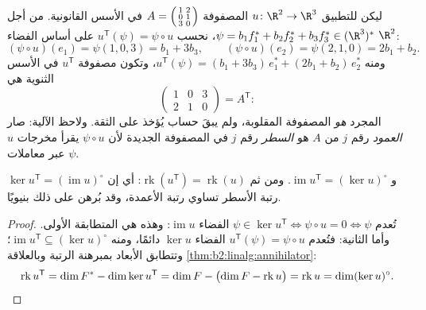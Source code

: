 \begin{example}\label{ex:b2:linalg:transposework}
ليكن للتطبيق $u \colon \R^2 \to \R^3$ المصفوفة $A =
\begin{psmallmatrix} 1 & 2\\ 0 & 1\\ 3 & 0\end{psmallmatrix}$ في
الأسس القانونية. من أجل $\psi = b_1f_1^* + b_2f_2^* + b_3f_3^*
\in (\R^3)^*$، نحسب $u^{\mathsf T}(\psi) = \psi \circ u$ على
أساس الفضاء $\R^2$:
\[
(\psi \circ u)(e_1) = \psi(1, 0, 3) = b_1 + 3b_3,
\qquad
(\psi \circ u)(e_2) = \psi(2, 1, 0) = 2b_1 + b_2 .
\]
ومنه $u^{\mathsf T}(\psi) = (b_1 + 3b_3)\,e_1^* + (2b_1 +
b_2)\,e_2^*$، وتكون مصفوفة $u^{\mathsf T}$ في الأسس الثنوية هي
\[
\begin{pmatrix} 1 & 0 & 3\\ 2 & 1 & 0\end{pmatrix}
= A^{\mathsf T} :
\]
 المجرد \emph{هو} المصفوفة المقلوبة، ولم يبقَ حساب
يُؤخذ على الثقة. ولاحظ الآلية: صار \emph{العمود} رقم
$j$ من $A$ هو \emph{السطر} رقم $j$ في المصفوفة
الجديدة لأن $\psi \circ u$ يقرأ مخرجات $u$ عبر
معاملات $\psi$.
\end{example}

\begin{proposition}\label{prop:b2:linalg:transposerank}
$\ker u^{\mathsf T} = (\operatorname{im} u)^{\circ}$ و
$\operatorname{im} u^{\mathsf T} = (\ker u)^{\circ}$. ومن ثم
$\operatorname{rk}(u^{\mathsf T}) = \operatorname{rk}(u)$: أي إن رتبة الأسطر
تساوي رتبة الأعمدة، وقد بُرهن على ذلك بنيويًا.
\end{proposition}

\begin{proof}
تُعدم $\psi \in \ker u^{\mathsf T} \iff \psi \circ u = 0 \iff \psi$ الفضاء
$\operatorname{im} u$: وهذه هي المتطابقة الأولى. وأما الثانية: فتُعدم $u^{\mathsf
T}(\psi) = \psi \circ u$ الفضاء $\ker u$ دائمًا، ومنه
$\operatorname{im} u^{\mathsf T} \subseteq (\ker u)^\circ$؛
وتتطابق الأبعاد بمبرهنة الرتبة وبالعلاقة
\cref{thm:b2:linalg:annihilator}:
\[
\operatorname{rk} u^{\mathsf T} = \dim F^* - \dim\ker u^{\mathsf T}
= \dim F - \bigl(\dim F - \operatorname{rk} u\bigr)
= \operatorname{rk} u
= \dim (\ker u)^{\circ} . \qedhere
\]
\end{proof}

